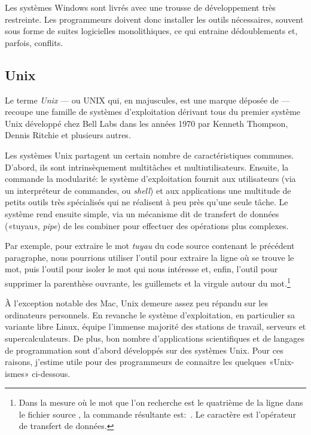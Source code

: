Les systèmes Windows sont livrés avec une trousse de développement
très restreinte. Les programmeurs doivent donc installer les outils
nécessaires, souvent sous forme de suites logicielles monolithiques,
ce qui entraine dédoublements et, parfois, conflits.

\subsection{Unix}
\label{sec:informatique:os:unix}

Le terme \emph{Unix} --- ou UNIX qui, en majuscules, est
une marque déposée de 
--- recoupe une famille de systèmes d'exploitation dérivant tous du
premier système Unix développé chez Bell Labs dans les années 1970 par
Kenneth Thompson, Dennis Ritchie et plusieurs autres.

Les systèmes Unix partagent un certain nombre de caractéristiques
communes. D'abord, ils sont intrinsèquement multitâches et
multiutilisateurs. Ensuite, la
 commande la modularité: le système d'exploitation fournit aux
utilisateurs (via un interpréteur de commandes, ou \emph{shell}) et
aux applications une multitude de petits outils très spécialisés qui
ne réalisent à peu près qu'une seule tâche. Le système rend ensuite
simple, via un mécanisme dit de transfert de données («tuyau»,
\emph{pipe}) de les combiner pour effectuer des opérations plus
complexes.

Par exemple, pour extraire le mot \emph{tuyau} du code source
contenant le précédent paragraphe, nous pourrions utiliser l'outil
 pour extraire la ligne où se trouve le mot, puis l'outil
 pour isoler le mot qui nous intéresse et, enfin, l'outil
 pour supprimer la parenthèse ouvrante, les guillemets et la
virgule autour du mot.\footnote{%
  Dans la mesure où le mot que l'on recherche est le quatrième de la
  ligne dans le fichier source , la commande
  résultante est: \,. Le caractère \code{|} est l'opérateur de
  transfert de données.}

À l'exception notable des Mac, Unix demeure assez peu répandu sur les
ordinateurs personnels. En revanche le système d'exploitation, en
particulier sa variante libre Linux, équipe l'immense majorité des
stations de travail, serveurs et supercalculateurs. De plus, bon
nombre d'applications scientifiques et de langages de programmation
sont d'abord développés sur des systèmes Unix. Pour ces
raisons, j'estime utile pour des programmeurs de connaitre les
quelques «Unix-ismes» ci-dessous.

